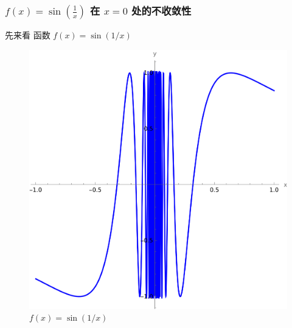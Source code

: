 \documentclass[
10pt, 
aspectratio=43, 
]{beamer}
\begin{document}
\begin{frame}
	\frametitle{$f(x) = \sin\left(\frac{1}{x}\right)$ 在 $x=0$ 处的不收敛性}
	先来看 函数 $f(x) = \sin(1/x)$
	\begin{figure}
		\centering
		\includegraphics[width=0.4\linewidth]{sin1x.png}
		\caption{$f(x) = \sin(1/x)$}
		
	\end{figure}
\end{frame}
\end{document}
